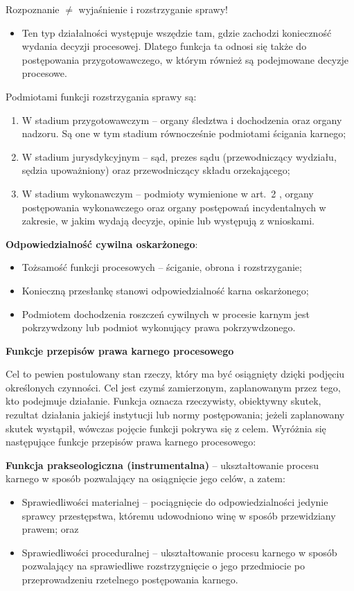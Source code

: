 Rozpoznanie $\neq$ wyjaśnienie i rozstrzyganie sprawy!\begin{itemize}
    \item Ten typ działalności występuje wszędzie tam, gdzie zachodzi konieczność wydania decyzji procesowej. Dlatego funkcja ta odnosi się także do postępowania przygotowawczego, w którym również są podejmowane decyzje procesowe.
\end{itemize}

Podmiotami funkcji rozstrzygania sprawy są:\begin{enumerate}
    \item W stadium przygotowawczym – organy śledztwa i dochodzenia oraz organy nadzoru. Są one w tym stadium równocześnie podmiotami ścigania karnego;
    \item W stadium jurysdykcyjnym – sąd, prezes sądu (przewodniczący wydziału, sędzia upoważniony) oraz przewodniczący składu orzekającego;
    \item W stadium wykonawczym – podmioty wymienione w art. 2 , organy postępowania wykonawczego oraz organy postępowań incydentalnych w zakresie, w jakim wydają decyzje, opinie lub występują z wnioskami.
\end{enumerate}

\textbf{Odpowiedzialność cywilna oskarżonego}:\begin{itemize}
    \item Tożsamość funkcji procesowych – ściganie, obrona i rozstrzyganie;
    \item Konieczną przesłankę stanowi odpowiedzialność karna oskarżonego;
    \item Podmiotem dochodzenia roszczeń cywilnych w procesie karnym jest pokrzywdzony lub podmiot wykonujący prawa pokrzywdzonego. 
\end{itemize}

\noindent\textbf{Funkcje przepisów prawa karnego procesowego}\medskip

Cel to pewien postulowany stan rzeczy, który ma być osiągnięty dzięki podjęciu określonych czynności. Cel jest czymś zamierzonym, zaplanowanym przez tego, kto podejmuje działanie. Funkcja oznacza rzeczywisty, obiektywny skutek, rezultat działania jakiejś instytucji lub normy postępowania; jeżeli zaplanowany skutek wystąpił, wówczas pojęcie funkcji pokrywa się z celem. Wyróżnia się następujące funkcje przepisów prawa karnego procesowego:\medskip

\textbf{Funkcja prakseologiczna (instrumentalna)} – ukształtowanie procesu karnego w sposób pozwalający na osiągnięcie jego celów, a zatem:\begin{itemize}
    \item Sprawiedliwości materialnej – pociągnięcie do odpowiedzialności jedynie sprawcy przestępstwa, któremu udowodniono winę w sposób przewidziany prawem; oraz
    \item Sprawiedliwości proceduralnej – ukształtowanie procesu karnego w sposób pozwalający na sprawiedliwe rozstrzygnięcie o jego przedmiocie po przeprowadzeniu rzetelnego postępowania karnego.
\end{itemize}

